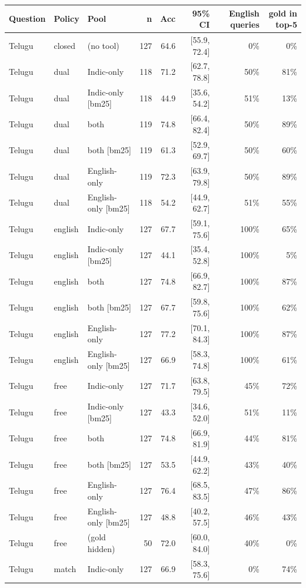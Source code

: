 \begin{table}[h]\centering\scriptsize
\begin{tabular}{lllrrrrr}
\toprule
Question & Policy & Pool & n & Acc & 95\% CI & English queries & gold in top-5 \\
\midrule
Telugu & closed & (no tool) & 127 & 64.6 & [55.9, 72.4] & 0\% & 0\% \\
Telugu & dual & Indic-only & 118 & 71.2 & [62.7, 78.8] & 50\% & 81\% \\
Telugu & dual & Indic-only [bm25] & 118 & 44.9 & [35.6, 54.2] & 51\% & 13\% \\
Telugu & dual & both & 119 & 74.8 & [66.4, 82.4] & 50\% & 89\% \\
Telugu & dual & both [bm25] & 119 & 61.3 & [52.9, 69.7] & 50\% & 60\% \\
Telugu & dual & English-only & 119 & 72.3 & [63.9, 79.8] & 50\% & 89\% \\
Telugu & dual & English-only [bm25] & 118 & 54.2 & [44.9, 62.7] & 51\% & 55\% \\
Telugu & english & Indic-only & 127 & 67.7 & [59.1, 75.6] & 100\% & 65\% \\
Telugu & english & Indic-only [bm25] & 127 & 44.1 & [35.4, 52.8] & 100\% & 5\% \\
Telugu & english & both & 127 & 74.8 & [66.9, 82.7] & 100\% & 87\% \\
Telugu & english & both [bm25] & 127 & 67.7 & [59.8, 75.6] & 100\% & 62\% \\
Telugu & english & English-only & 127 & 77.2 & [70.1, 84.3] & 100\% & 87\% \\
Telugu & english & English-only [bm25] & 127 & 66.9 & [58.3, 74.8] & 100\% & 61\% \\
Telugu & free & Indic-only & 127 & 71.7 & [63.8, 79.5] & 45\% & 72\% \\
Telugu & free & Indic-only [bm25] & 127 & 43.3 & [34.6, 52.0] & 51\% & 11\% \\
Telugu & free & both & 127 & 74.8 & [66.9, 81.9] & 44\% & 81\% \\
Telugu & free & both [bm25] & 127 & 53.5 & [44.9, 62.2] & 43\% & 40\% \\
Telugu & free & English-only & 127 & 76.4 & [68.5, 83.5] & 47\% & 86\% \\
Telugu & free & English-only [bm25] & 127 & 48.8 & [40.2, 57.5] & 46\% & 43\% \\
Telugu & free & (gold hidden) & 50 & 72.0 & [60.0, 84.0] & 40\% & 0\% \\
Telugu & match & Indic-only & 127 & 66.9 & [58.3, 75.6] & 0\% & 74\% \\

\end{tabular}
\end{table}
